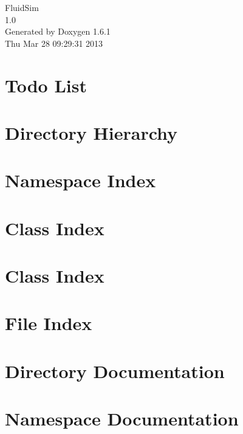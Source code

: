 \documentclass[a4paper]{book}
\begin{document}
\hypersetup{pageanchor=false}
\begin{titlepage}
\vspace*{7cm}
\begin{center}
{\Large FluidSim \\[1ex]\large 1.0 }\\
\vspace*{1cm}
{\large Generated by Doxygen 1.6.1}\\
\vspace*{0.5cm}
{\small Thu Mar 28 09:29:31 2013}\\
\end{center}
\end{titlepage}
\clearemptydoublepage
{}
\tableofcontents
\clearemptydoublepage
{}
\hypersetup{pageanchor=true}
\chapter{Todo List}
\label{todo}
\hypertarget{todo}{}

\chapter{Directory Hierarchy}

\chapter{Namespace Index}

\chapter{Class Index}

\chapter{Class Index}

\chapter{File Index}

\chapter{Directory Documentation}



\chapter{Namespace Documentation}

\end{document}
